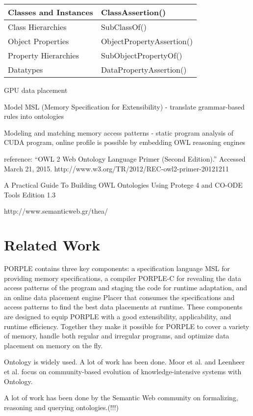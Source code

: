 \documentclass{sig-alternate}
\begin{document}
{\begin{table*}
\begin{tabular}{|l|l|}
Classes and Instances&ClassAssertion()\\ \hline
Class Hierarchies&SubClassOf()\\ \hline
Object Properties&ObjectPropertyAssertion()\\ \hline
Property Hierarchies&SubObjectPropertyOf()\\ \hline
Datatypes&DataPropertyAssertion()\\ \hline
\end{tabular}
\label{table:accuracy}
\end{table*}

GPU data placement

Model MSL (Memory Specification for Extensibility) - translate grammar-based rules into ontologies

Modeling and matching memory access patterns - static program analysis of CUDA program, online profile is possible by embedding OWL reasoning engines 

reference: “OWL 2 Web Ontology Language Primer (Second Edition).” Accessed March 21, 2015. http://www.w3.org/TR/2012/REC-owl2-primer-20121211 

A Practical Guide To Building OWL Ontologies Using Protege 4 and CO-ODE Tools Edition 1.3 

http://www.semanticweb.gr/thea/

\section{Related Work}
PORPLE contains three key components: a specification language MSL for providing memory specifications, a compiler PORPLE-C for revealing the data access patterns of the program and staging the code for runtime adaptation, and an online data placement engine Placer that consumes the specifications and access patterns to find the best data placements at runtime. These components are designed to equip PORPLE with a good extensibility, applicability, and runtime efficiency. Together they make it possible for PORPLE to cover a variety of memory, handle both regular and irregular programs, and optimize data placement on memory on the fly.

Ontology is widely used. A lot of work has been done. Moor et al. \cite{ontology3} and Leenheer et al. \cite{ontology4} focus on community-based evolution of knowledge-intensive systems with Ontology.

A lot of work has been done by the Semantic Web community on formalizing, reasoning and querying ontologies.(!!!)

}
\end{document}
